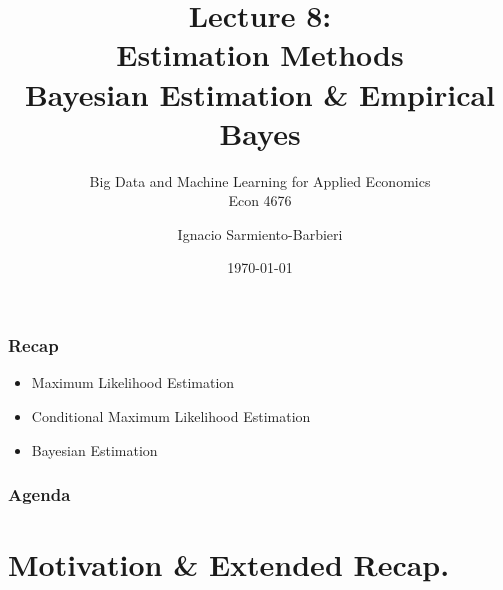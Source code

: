 \documentclass[
  shownotes,
  xcolor={svgnames},
  hyperref={colorlinks,citecolor=DarkBlue,linkcolor=DarkRed,urlcolor=DarkBlue}
  ]{beamer}
\begin{document}
\title[Lecture 8]{Lecture 8: \\ Estimation Methods \\  Bayesian Estimation \& Empirical Bayes}
\subtitle{Big Data and Machine Learning for Applied Economics \\ Econ 4676}
\date{\today}

\author[Sarmiento-Barbieri]{Ignacio Sarmiento-Barbieri}


\begin{frame}[noframenumbering]
\maketitle
\end{frame}



\begin{frame}
\frametitle{Recap}

\begin{itemize} 
      
    \item Maximum Likelihood Estimation
    \bigskip
    \item Conditional Maximum Likelihood Estimation
    \bigskip
    \item Bayesian Estimation
  
\end{itemize}
\end{frame}


\begin{frame}
\frametitle{Agenda}

\tableofcontents


\end{frame}



\section{Motivation \& Extended Recap.}
\end{document}
